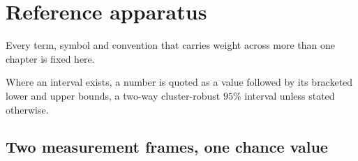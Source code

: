 %
%

\chapter*{Reference apparatus}
{}
\label{sec:howtoread}
\framedecl{-}

\begin{question}
Every term, symbol and convention that carries weight across more than one
chapter is fixed here.
\end{question}

\noindent
Where an interval exists, a number is quoted as a value followed by its
bracketed lower and upper bounds, a two-way cluster-robust $95\%$ interval
unless stated otherwise.

\section*{Two measurement frames, one chance value}

